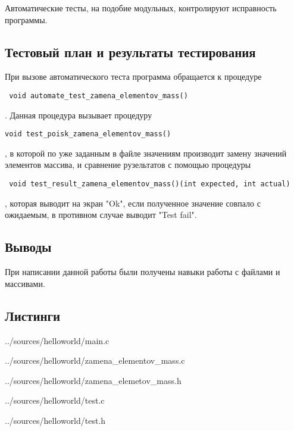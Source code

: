\documentclass[12pt,a4paper]{report}
\begin{document}
Автоматические тесты, на подобие модульных, контролируют исправность программы.
\subsection{Тестовый план и результаты тестирования}
При вызове автоматического теста программа обращается к процедуре\begin{verbatim} void automate_test_zamena_elementov_mass()\end{verbatim}. Данная процедура вызывает процедуру \begin{verbatim}void test_poisk_zamena_elementov_mass()\end{verbatim}, в которой по уже заданным в файле значениям производит замену значений элементов массива, и сравнение рузельтатов с помощью процедуры\begin{verbatim} void test_result_zamena_elementov_mass()(int expected, int actual)\end{verbatim}, которая выводит на экран "Ok", если полученное значение совпало с ожидаемым, в противном случае выводит "Test fail".
\subsection{Выводы}
При написании данной работы были получены навыки работы с файлами и массивами.
\subsection*{Листинги}

{../sources/helloworld/main.c}


{../sources/helloworld/zamena_elementov_mass.c}


{../sources/helloworld/zamena_elemetov_mass.h}


{../sources/helloworld/test.c}


{../sources/helloworld/test.h}

\end{document}
